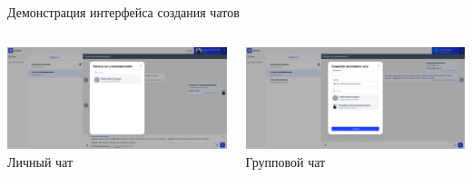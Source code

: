 \documentclass[aspectratio=169]{beamer}
\begin{document}
\begin{frame}{Демонстрация интерфейса создания чатов}
\small
\justifying

\begin{columns}
  \begin{column}{0.5\textwidth}
    \centering
    \includegraphics[width=0.95\linewidth]{static/ChatsStudentCreateChat.png} \\
    \small Личный чат
  \end{column}
  \begin{column}{0.5\textwidth}
    \centering
    \includegraphics[width=0.95\linewidth]{static/ChatsTeacherCreateGroupChat.png} \\
    \small Групповой чат
  \end{column}
\end{columns}
\end{frame}
\end{document}
